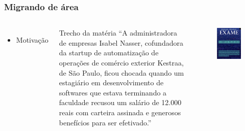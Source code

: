 \documentclass[    
  12pt, 
  compress,
  aspectratio=169,
  blue
  ]{beamer}
\begin{document}

\begin{frame}
\frametitle{ Migrando de área}   
\begin{columns}[c]
\begin{itemize}
\item<1-> Motivação 
\end{itemize}
\begin{block}{Trecho da matéria}
“A administradora de empresas Isabel Nasser, cofundadora da startup de automatização de operações de comércio exterior Kestraa,  de São Paulo, ficou chocada quando um estagiário em desenvolvimento de softwares que estava terminando a faculdade recusou um salário de 12.000 reais com carteira assinada e generosos benefícios para ser efetivado.”
\end{block}
\centering
\begin{figure}
\includegraphics[scale=0.3]{revista}
\end{figure}
\end{columns}
\end{frame}
\end{document}
